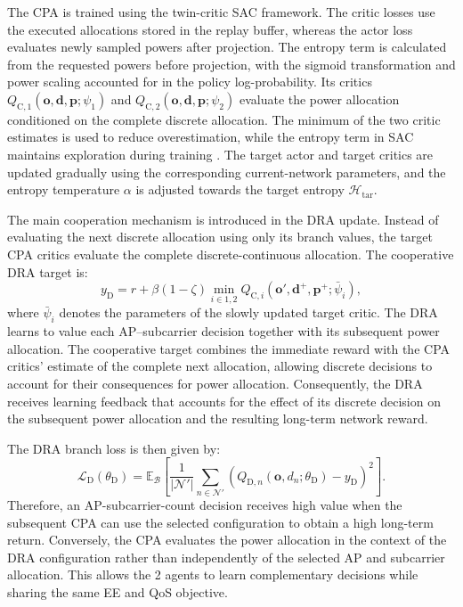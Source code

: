 \documentclass[journal]{IEEEtran}
\begin{document}
The CPA is trained using the twin-critic SAC framework. The critic losses use the executed allocations stored in
the replay buffer, whereas the actor loss evaluates newly
sampled powers after projection. The entropy term is
calculated from the requested powers before projection,
with the sigmoid transformation and power scaling
accounted for in the policy log-probability. Its critics
$Q_{\mathrm{C},1}(\mathbf{o},\mathbf{d},\mathbf{p};\psi_{1})$ and
$Q_{\mathrm{C},2}(\mathbf{o},\mathbf{d},\mathbf{p};\psi_{2})$
evaluate the power allocation conditioned on the complete discrete
allocation. The minimum of the two critic estimates is used to reduce
overestimation, while the entropy term in SAC maintains exploration
during training \cite{Haarnoja2018SAC}. The target actor and target critics are updated gradually
using the corresponding current-network parameters, and the entropy temperature $\alpha$ is adjusted towards
the target entropy $\mathcal{H}_{\mathrm{tar}}$.

The main cooperation mechanism is introduced in the DRA update.
Instead of evaluating the next discrete allocation using only its
branch values, the target CPA critics evaluate the complete
discrete-continuous allocation. The cooperative DRA target is:
\begin{equation}
y_{\mathrm{D}}
=
r
+
\beta(1-\zeta)
\min_{i\in{1,2}}
Q_{\mathrm{C},i}
\left(
\mathbf{o}',\mathbf{d}^{+},\mathbf{p}^{+};
\bar{\psi}_{i}
\right),
\label{eq:cooperative_dra_target}
\end{equation}
where $\bar{\psi}_{i}$ denotes the parameters of the slowly updated
target critic. The DRA learns to value each AP–subcarrier decision together with its subsequent power allocation. The cooperative target combines the immediate reward with the CPA critics’ estimate of the complete next allocation, allowing discrete decisions to account for their consequences for power allocation.
Consequently, the DRA receives learning feedback that accounts for the
effect of its discrete decision on the subsequent power allocation and
the resulting long-term network reward.

The DRA branch loss is then given by:
\begin{equation}
\mathcal{L}_{\mathrm{D}}(\theta_{\mathrm{D}})
=
\mathbb{E}_{\mathcal{B}}
\left[
\frac{1}{|\mathcal{N}'|}
\sum_{n\in\mathcal{N}'}
\left(
Q_{\mathrm{D},n}
(\mathbf{o},d_n;\theta_{\mathrm{D}})
-
y_{\mathrm{D}}
\right)^{2}
\right].
\label{eq:cooperative_dra_loss}
\end{equation}
Therefore, an AP-subcarrier-count decision receives high value when
the subsequent CPA can use the selected configuration to obtain a high
long-term return. Conversely, the CPA evaluates the power
allocation in the context of the DRA configuration rather than
independently of the selected AP and subcarrier allocation. This
allows the 2 agents to learn complementary decisions while sharing
the same EE and QoS objective.
\end{document}
